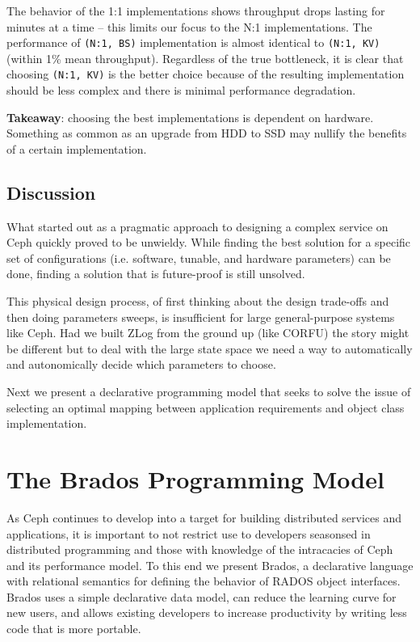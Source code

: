 \documentclass[10pt,twocolumn]{article}
\begin{document}
The behavior of the 1:1 implementations shows throughput drops lasting for
minutes at a time -- this limits our focus to the N:1 implementations. The
performance of \texttt{(N:1, BS)} implementation is almost identical to
\texttt{(N:1, KV)} (within 1\% mean throughput). Regardless of the true
bottleneck, it is clear that choosing \texttt{(N:1, KV)} is the better choice
because of the resulting implementation should be less complex and there is
minimal performance degradation.

\textbf{Takeaway}: choosing the best implementations is dependent on hardware.
Something as common as an upgrade from HDD to SSD may nullify the benefits of a
certain implementation. 

\subsection{Discussion}

What started out as a pragmatic approach to designing a complex service on Ceph
quickly proved to be unwieldy. While finding the best solution for a specific
set of configurations (i.e. software, tunable, and hardware parameters) can be
done, finding a solution that is future-proof is still unsolved. 

This physical design process, of first thinking about the design trade-offs and
then doing parameters sweeps, is insufficient for large general-purpose systems
like Ceph. Had we built ZLog from the ground up (like CORFU) the story might be
different but to deal with the large state space we need a way to automatically
and autonomically decide which parameters to choose. 

Next we present a declarative programming model that seeks to solve the issue
of selecting an optimal mapping between application requirements and object
class implementation.

\section{The Brados Programming Model}

As Ceph continues to develop into a target for building distributed services
and applications, it is important to not restrict use to developers seasonsed
in distributed programming and those with knowledge of the intracacies of Ceph
and its performance model. To this end we present Brados, a declarative language with
relational semantics for defining the behavior of RADOS object interfaces.
Brados uses a simple declarative data model, can reduce the learning curve
for new users, and allows existing developers to increase productivity by
writing less code that is more portable.
\end{document}
